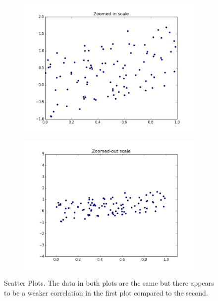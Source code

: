 \begin{figure}[h]
\centering
\begin{subfigure}{.45\textwidth}
\centering
\includegraphics[width=\textwidth]{scale_scatter_zoomed_in.png}
\end{subfigure}
\begin{subfigure}{.45\textwidth}
\centering
\includegraphics[width=\textwidth]{scale_scatter_zoomed_out.png}
\end{subfigure}
\caption{Scatter Plots.  The data in both plots are the same but there appears to be a weaker
correlation in the first plot compared to the second.}
\label{fig:scatter_correlation}
\end{figure}

